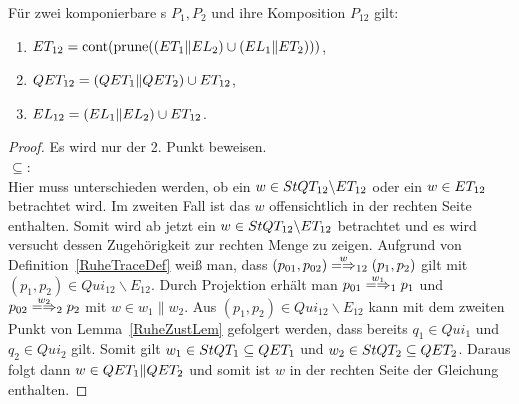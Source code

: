 \begin{Satz}
  \label{RuheSemSatz}
  Für zwei komponierbare \MEIO{}s $P_1,P_2$ und ihre Komposition $P_{12}$ gilt:
  \begin{enumerate}
    \item $ET _{12}=\mathrm{cont} (\mathrm{prune} ((ET _1\|EL _2)\cup (EL _1\|ET _2)))$,
    \item $QET _{12}=(QET _1\|QET _2)\cup ET _{12}$,
    \item $EL _{12}=(EL _1\|EL _2)\cup ET _{12}$.
  \end{enumerate}
\end{Satz}
\begin{proof}
  Es wird nur der 2. Punkt beweisen.\\
  \glqq$\subseteq$\grqq{}:\\
  Hier muss unterschieden werden, ob ein $w\in StQT _{12}\backslash ET _{12}$
  oder ein $w\in ET _{12}$ betrachtet wird. Im zweiten Fall ist das $w$
  offensichtlich in der rechten Seite enthalten. Somit wird ab jetzt ein
  $w\in StQT _{12}\backslash ET _{12}$ betrachtet und es wird versucht dessen
  Zugehörigkeit zur rechten Menge zu zeigen. Aufgrund von
  Definition~\ref{RuheTraceDef} weiß man, dass
  $(p_{01},p_{02})\weakmay[w]_{12}(p_1,p_2)$ gilt mit $(p_1,p_2)\in Qui_{12}
  \backslash E_{12}$. Durch Projektion erhält man $p_{01} \weakmay[w_1]_1
  p_1$ und $p_{02}\weakmay[w_2]_2p_2$ mit $w\in w_1\|w_2$. Aus $(p_1,p_2)\in
  Qui_{12}\backslash E_{12}$ kann mit dem zweiten Punkt von
  Lemma~\ref{RuheZustLem} gefolgert werden, dass bereits $q_1\in Qui_1$ und
  $q_2\in Qui_2$ gilt. Somit gilt $w_1\in StQT _1\subseteq QET _1$ und $w_2\in
  StQT _2\subseteq QET _2$. Daraus folgt dann $w\in QET _1\|QET _2$ und
  somit ist $w$ in der rechten Seite der Gleichung enthalten.


\end{proof}
